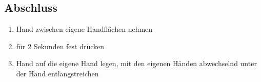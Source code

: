 \subsection{Abschluss}
\begin{enumerate}
\item Hand zwischen eigene Handflächen nehmen
\item für 2 Sekunden fest drücken
\item Hand auf die eigene Hand legen, mit den eigenen Händen abwechselnd unter der Hand entlangstreichen
\end{enumerate}
